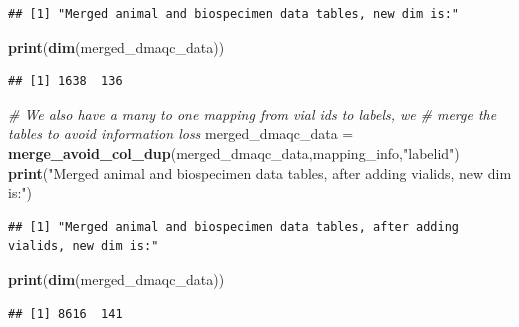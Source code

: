 \documentclass[]{article}
\newenvironment{Shaded}{\begin{snugshade}}{\end{snugshade}}
\newcommand{\KeywordTok}[1]{\textcolor[rgb]{0.13,0.29,0.53}{\textbf{#1}}}
\newcommand{\StringTok}[1]{\textcolor[rgb]{0.31,0.60,0.02}{#1}}
\newcommand{\CommentTok}[1]{\textcolor[rgb]{0.56,0.35,0.01}{\textit{#1}}}
\newcommand{\NormalTok}[1]{#1}
\begin{document}
\begin{verbatim}
## [1] "Merged animal and biospecimen data tables, new dim is:"
\end{verbatim}

\begin{Shaded}
\begin{Highlighting}[]
\KeywordTok{print}\NormalTok{(}\KeywordTok{dim}\NormalTok{(merged_dmaqc_data))}
\end{Highlighting}
\end{Shaded}

\begin{verbatim}
## [1] 1638  136
\end{verbatim}

\begin{Shaded}
\begin{Highlighting}[]
\CommentTok{# We also have a many to one mapping from vial ids to labels, we }
\CommentTok{# merge the tables to avoid information loss}
\NormalTok{merged_dmaqc_data =}\StringTok{ }\KeywordTok{merge_avoid_col_dup}\NormalTok{(merged_dmaqc_data,mapping_info,}\StringTok{"labelid"}\NormalTok{)}
\KeywordTok{print}\NormalTok{(}\StringTok{"Merged animal and biospecimen data tables, after adding vialids, new dim is:"}\NormalTok{)}
\end{Highlighting}
\end{Shaded}

\begin{verbatim}
## [1] "Merged animal and biospecimen data tables, after adding vialids, new dim is:"
\end{verbatim}

\begin{Shaded}
\begin{Highlighting}[]
\KeywordTok{print}\NormalTok{(}\KeywordTok{dim}\NormalTok{(merged_dmaqc_data))}
\end{Highlighting}
\end{Shaded}

\begin{verbatim}
## [1] 8616  141
\end{verbatim}
\end{document}
